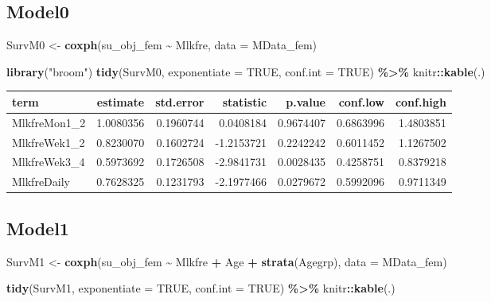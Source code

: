 \documentclass[
]{article}
\newenvironment{Shaded}{\begin{snugshade}}{\end{snugshade}}
\newcommand{\DataTypeTok}[1]{\textcolor[rgb]{0.13,0.29,0.53}{#1}}
\newcommand{\KeywordTok}[1]{\textcolor[rgb]{0.13,0.29,0.53}{\textbf{#1}}}
\newcommand{\NormalTok}[1]{#1}
\newcommand{\OperatorTok}[1]{\textcolor[rgb]{0.81,0.36,0.00}{\textbf{#1}}}
\newcommand{\OtherTok}[1]{\textcolor[rgb]{0.56,0.35,0.01}{#1}}
\newcommand{\StringTok}[1]{\textcolor[rgb]{0.31,0.60,0.02}{#1}}
\begin{document}
\hypertarget{model0-6}{%
\subsection{Model0}\label{model0-6}}

\begin{Shaded}
\begin{Highlighting}[]
\NormalTok{SurvM0 \textless{}{-}}\StringTok{  }\KeywordTok{coxph}\NormalTok{(su\_obj\_fem }\OperatorTok{\textasciitilde{}}\StringTok{ }\NormalTok{Mlkfre, }
                 \DataTypeTok{data =}\NormalTok{ MData\_fem)}

\KeywordTok{library}\NormalTok{(}\StringTok{"broom"}\NormalTok{)}
\KeywordTok{tidy}\NormalTok{(SurvM0, }\DataTypeTok{exponentiate =} \OtherTok{TRUE}\NormalTok{, }\DataTypeTok{conf.int =} \OtherTok{TRUE}\NormalTok{) }\OperatorTok{\%\textgreater{}\%}\StringTok{ }
\StringTok{  }\NormalTok{knitr}\OperatorTok{::}\KeywordTok{kable}\NormalTok{(.)}
\end{Highlighting}
\end{Shaded}

\begin{longtable}[]{@{}lrrrrrr@{}}
\toprule
term & estimate & std.error & statistic & p.value & conf.low &
conf.high\tabularnewline
\midrule
\endhead
MlkfreMon1\_2 & 1.0080356 & 0.1960744 & 0.0408184 & 0.9674407 &
0.6863996 & 1.4803851\tabularnewline
MlkfreWek1\_2 & 0.8230070 & 0.1602724 & -1.2153721 & 0.2242242 &
0.6011452 & 1.1267502\tabularnewline
MlkfreWek3\_4 & 0.5973692 & 0.1726508 & -2.9841731 & 0.0028435 &
0.4258751 & 0.8379218\tabularnewline
MlkfreDaily & 0.7628325 & 0.1231793 & -2.1977466 & 0.0279672 & 0.5992096
& 0.9711349\tabularnewline
\bottomrule
\end{longtable}

\hypertarget{model1-6}{%
\subsection{Model1}\label{model1-6}}

\begin{Shaded}
\begin{Highlighting}[]
\NormalTok{SurvM1 \textless{}{-}}\StringTok{  }\KeywordTok{coxph}\NormalTok{(su\_obj\_fem }\OperatorTok{\textasciitilde{}}\StringTok{ }\NormalTok{Mlkfre }\OperatorTok{+}\StringTok{ }\NormalTok{Age }\OperatorTok{+}\StringTok{ }\KeywordTok{strata}\NormalTok{(Agegrp), }
                 \DataTypeTok{data =}\NormalTok{ MData\_fem)}

\KeywordTok{tidy}\NormalTok{(SurvM1, }\DataTypeTok{exponentiate =} \OtherTok{TRUE}\NormalTok{, }\DataTypeTok{conf.int =} \OtherTok{TRUE}\NormalTok{) }\OperatorTok{\%\textgreater{}\%}\StringTok{ }
\StringTok{  }\NormalTok{knitr}\OperatorTok{::}\KeywordTok{kable}\NormalTok{(.)}
\end{Highlighting}
\end{Shaded}
\end{document}
